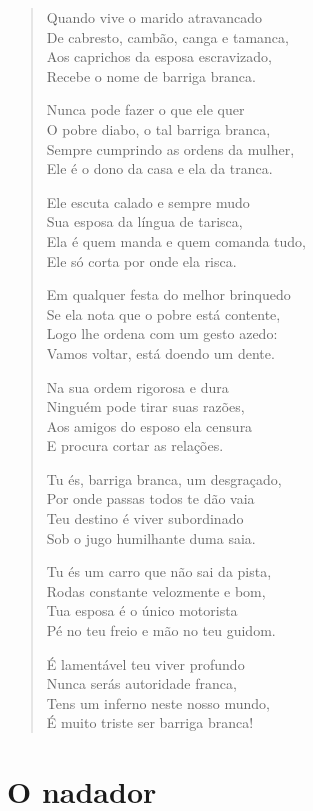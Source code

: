 \begin{verse}
Quando vive o marido atravancado\\
De cabresto, cambão, canga e tamanca,\\
Aos caprichos da esposa escravizado,\\
Recebe o nome de barriga branca.

Nunca pode fazer o que ele quer\\
O pobre diabo, o tal barriga branca,\\
Sempre cumprindo as ordens da mulher,\\
Ele é o dono da casa e ela da tranca.

Ele escuta calado e sempre mudo\\
Sua esposa da língua de tarisca,\\
Ela é quem manda e quem comanda tudo,\\
Ele só corta por onde ela risca.

Em qualquer festa do melhor brinquedo\\
Se ela nota que o pobre está contente,\\
Logo lhe ordena com um gesto azedo:\\
Vamos voltar, está doendo um dente.

Na sua ordem rigorosa e dura\\
Ninguém pode tirar suas razões,\\
Aos amigos do esposo ela censura\\
E procura cortar as relações.

Tu és, barriga branca, um desgraçado,\\
Por onde passas todos te dão vaia\\
Teu destino é viver subordinado\\
Sob o jugo humilhante duma saia.

Tu és um carro que não sai da pista,\\
Rodas constante velozmente e bom,\\
Tua esposa é o único motorista\\
Pé no teu freio e mão no teu guidom.

É lamentável teu viver profundo\\
Nunca serás autoridade franca,\\
Tens um inferno neste nosso mundo,\\
É muito triste ser barriga branca!
\end{verse}

\section{O nadador}

